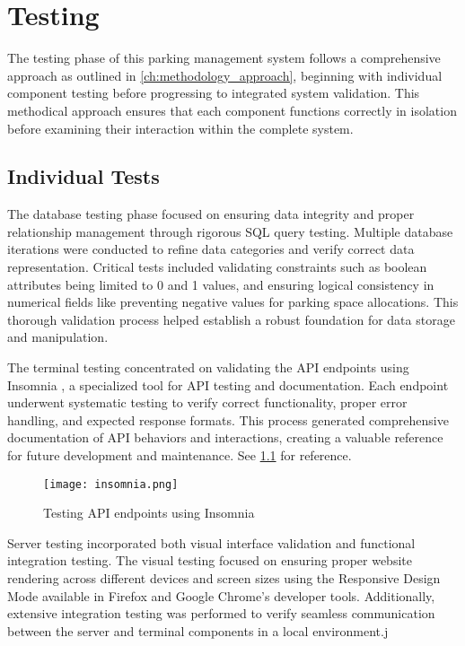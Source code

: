 \chapter{Testing}\label{ch:testing}

The testing phase of this parking management system follows a comprehensive approach as outlined in \cref{ch:methodology_approach}, beginning with individual component testing before progressing to integrated system validation. This methodical approach ensures that each component functions correctly in isolation before examining their interaction within the complete system.

\section{Individual Tests}

The database testing phase focused on ensuring data integrity and proper relationship management through rigorous SQL query testing. Multiple database iterations were conducted to refine data categories and verify correct data representation. Critical tests included validating constraints such as boolean attributes being limited to 0 and 1 values, and ensuring logical consistency in numerical fields like preventing negative values for parking space allocations. This thorough validation process helped establish a robust foundation for data storage and manipulation.

The terminal testing concentrated on validating the API endpoints using Insomnia \autocite{insomnia2025}, a specialized tool for API testing and documentation. Each endpoint underwent systematic testing to verify correct functionality, proper error handling, and expected response formats. This process generated comprehensive documentation of API behaviors and interactions, creating a valuable reference for future development and maintenance. See \cref{fig:insomnia} for reference.

\begin{figure}
        \texttt{[image: insomnia.png]}
    \caption{Testing API endpoints using Insomnia}\label{fig:insomnia}
\end{figure}

Server testing incorporated both visual interface validation and functional integration testing. The visual testing focused on ensuring proper website rendering across different devices and screen sizes using the Responsive Design Mode available in Firefox and Google Chrome's developer tools. Additionally, extensive integration testing was performed to verify seamless communication between the server and terminal components in a local environment.j

